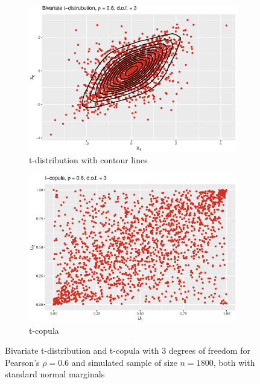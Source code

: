  \begin{figure}[H]
\centering
\begin{subfigure}{.45\textwidth}
  \centering
  \includegraphics[width=\linewidth]{figures/bivariate_t.eps}
  \caption{t-distribution with contour lines}
  \label{fig:bivariate_t}
\end{subfigure}
\begin{subfigure}{.45\textwidth}
  \centering
  \includegraphics[width=\linewidth]{figures/t_copula.eps}
  \caption{t-copula}
  \label{fig:t_copula}
\end{subfigure}
\caption{Bivariate t-distribution and t-copula with 3 degrees of freedom for Pearson's $\rho = 0.6$ and simulated sample of size $n = 1800$, both with standard normal marginals}
\label{fig:t_plots}
\end{figure}






